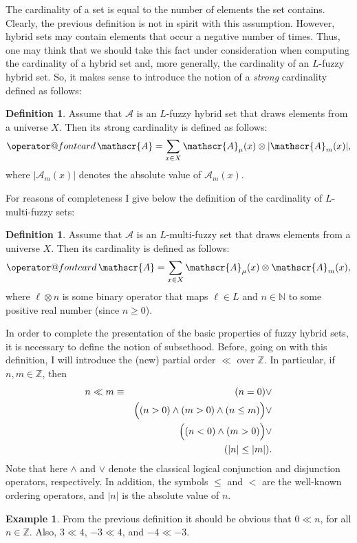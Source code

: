 \documentclass{amsart}
\makeatletter
\theoremstyle{definition}
\newtheorem{definition}[theorem]{Definition}
\newtheorem{example}[theorem]{Example}
\newcommand{\card}{\mathop{\operator@font card}}
\makeatother
\begin{document}
The cardinality of a set is equal to the number of elements the set contains. 
Clearly, the previous definition is not in spirit with this assumption. 
However, hybrid sets may contain elements that occur a negative number of 
times. Thus, one may think that we should take this fact under consideration 
when computing the cardinality of a hybrid set and, more generally, the 
cardinality of an $L$-fuzzy hybrid set. So, it makes sense to
introduce the notion of a {\em strong} cardinality defined as follows:   
\begin{definition}
Assume that $\mathscr{A}$ is an $L$-fuzzy hybrid set that draws elements from 
a universe $X$. Then its {\emph strong} cardinality is defined as follows:
\begin{displaymath}
\card\mathscr{A} = \sum_{x\in X}\mathscr{A}_{\mu}(x)\otimes
|\mathscr{A}_{m}(x)|,
\end{displaymath}
where $|\mathscr{A}_{m}(x)|$ denotes the absolute value of 
$\mathscr{A}_{m}(x)$. 
\end{definition}

For reasons of completeness I give below the definition of the cardinality of 
$L$-multi-fuzzy sets:
\begin{definition}
Assume that $\mathscr{A}$ is an $L$-multi-fuzzy set that draws elements from a 
universe $X$. Then its cardinality is defined as follows:
\begin{displaymath}
\card\mathscr{A} = \sum_{x\in X}\mathscr{A}_{\mu}(x)\otimes\mathscr{A}_{m}(x),
\end{displaymath}
where $\ell\otimes n$ is some binary operator that maps $\ell\in L$ and 
$n\in\mathbb{N}$ to some positive real number (since $n\ge0$).
\end{definition}

In order to complete the presentation of the basic properties of fuzzy hybrid sets, it is
necessary to define the notion of subsethood. Before, going on with this definition, I
will introduce the (new) partial order $\ll$ over $\mathbb{Z}$. In particular, if
$n,m\in\mathbb{Z}$, then 
\begin{eqnarray*}
n\ll m &\equiv& (n=0) \vee\\
       &      & \Bigl((n>0) \wedge (m>0) \wedge (n\le m)\Bigr) \vee\\
       &      & \Bigl((n<0) \wedge (m>0)\Bigr) \vee\\
       &      & (|n|\le|m|).
\end{eqnarray*}
Note that here $\wedge$ and $\vee$ denote the classical 
logical conjunction and disjunction operators, respectively. In addition, the symbols $\le$ and $<$ 
are the well-known ordering operators, and $|n|$ is the absolute value of $n$. 
\begin{example}
From the previous definition it should be obvious that $0\ll n$, for all $n\in\mathbb{Z}$. Also,
$3\ll 4$, $-3\ll 4$, and $-4\ll -3$.
\end{example}
\end{document}
